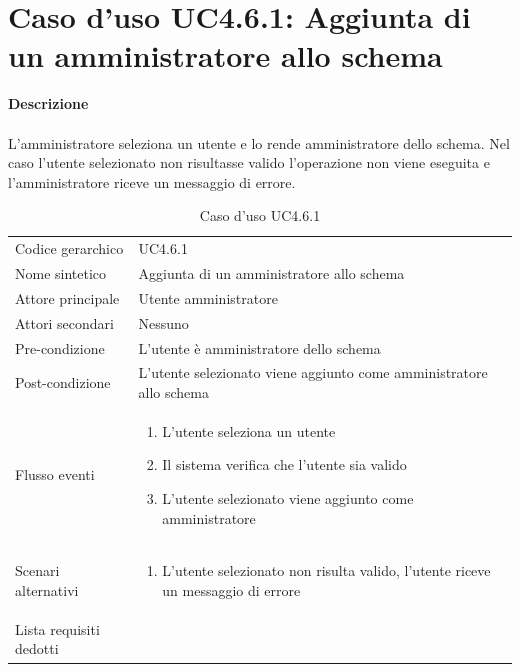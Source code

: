 \documentclass[a4paper]{report}
\begin{document}
	 \section{Caso d'uso UC4.6.1: Aggiunta di un amministratore allo schema}
	 \textbf{Descrizione} \\ \\
	 L'amministratore seleziona un utente e lo rende amministratore dello schema. Nel caso l'utente 
	 selezionato non risultasse valido l'operazione non viene eseguita e l'amministratore riceve un 
	 messaggio di errore.
		\begin{table}[H]
		\begin{tabularx}{\textwidth}{X | X}\toprule
			\rowcolor{orange!65}Codice gerarchico & UC4.6.1 \\
			Nome sintetico & Aggiunta di un amministratore allo schema \\
			\rowcolor{orange!65}Attore principale & Utente amministratore\\
			Attori secondari & Nessuno \\
			\rowcolor{orange!65}Pre-condizione & L'utente è amministratore dello schema \\
			Post-condizione & L'utente selezionato viene aggiunto come amministratore allo schema \\
			\rowcolor{orange!65}Flusso eventi & \begin{enumerate}
			\item L'utente seleziona un utente
			\item Il sistema verifica che l'utente sia valido
			\item L'utente selezionato viene aggiunto come amministratore
			\end{enumerate} \\
			Scenari alternativi & \begin{enumerate}
			\item L'utente selezionato non risulta valido, l'utente riceve un messaggio di errore
			\end{enumerate} \\
			\rowcolor{orange!65}Lista requisiti dedotti & \\
			\bottomrule
		\end{tabularx}
		\caption{Caso d'uso UC4.6.1}
	 \end{table}
\end{document}
